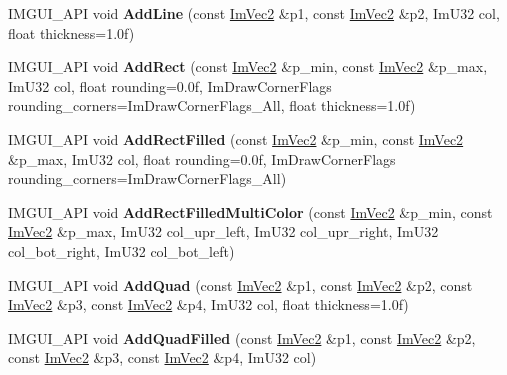 \begin{DoxyCompactItemize}
I\+M\+G\+U\+I\+\_\+\+A\+PI void {\bfseries Add\+Line} (const \hyperlink{structImVec2}{Im\+Vec2} \&p1, const \hyperlink{structImVec2}{Im\+Vec2} \&p2, Im\+U32 col, float thickness=1.\+0f)
\item 
\mbox{\label{structImDrawList_a766b752a701b00a7769b13c4c93cab06}} 
I\+M\+G\+U\+I\+\_\+\+A\+PI void {\bfseries Add\+Rect} (const \hyperlink{structImVec2}{Im\+Vec2} \&p\+\_\+min, const \hyperlink{structImVec2}{Im\+Vec2} \&p\+\_\+max, Im\+U32 col, float rounding=0.\+0f, Im\+Draw\+Corner\+Flags rounding\+\_\+corners=\+Im\+Draw\+Corner\+Flags\+\_\+\+All, float thickness=1.\+0f)
\item 
\mbox{\label{structImDrawList_af80a64eefee86b0f1b0876d3f753935d}} 
I\+M\+G\+U\+I\+\_\+\+A\+PI void {\bfseries Add\+Rect\+Filled} (const \hyperlink{structImVec2}{Im\+Vec2} \&p\+\_\+min, const \hyperlink{structImVec2}{Im\+Vec2} \&p\+\_\+max, Im\+U32 col, float rounding=0.\+0f, Im\+Draw\+Corner\+Flags rounding\+\_\+corners=\+Im\+Draw\+Corner\+Flags\+\_\+\+All)
\item 
\mbox{\label{structImDrawList_a6282e85ad78b01ebb74832336e9a2a55}} 
I\+M\+G\+U\+I\+\_\+\+A\+PI void {\bfseries Add\+Rect\+Filled\+Multi\+Color} (const \hyperlink{structImVec2}{Im\+Vec2} \&p\+\_\+min, const \hyperlink{structImVec2}{Im\+Vec2} \&p\+\_\+max, Im\+U32 col\+\_\+upr\+\_\+left, Im\+U32 col\+\_\+upr\+\_\+right, Im\+U32 col\+\_\+bot\+\_\+right, Im\+U32 col\+\_\+bot\+\_\+left)
\item 
\mbox{\label{structImDrawList_a57b014138de51397db0570d88c770d9f}} 
I\+M\+G\+U\+I\+\_\+\+A\+PI void {\bfseries Add\+Quad} (const \hyperlink{structImVec2}{Im\+Vec2} \&p1, const \hyperlink{structImVec2}{Im\+Vec2} \&p2, const \hyperlink{structImVec2}{Im\+Vec2} \&p3, const \hyperlink{structImVec2}{Im\+Vec2} \&p4, Im\+U32 col, float thickness=1.\+0f)
\item 
\mbox{\label{structImDrawList_a2b982fbad35f8736fdfc9d6e7db2ca94}} 
I\+M\+G\+U\+I\+\_\+\+A\+PI void {\bfseries Add\+Quad\+Filled} (const \hyperlink{structImVec2}{Im\+Vec2} \&p1, const \hyperlink{structImVec2}{Im\+Vec2} \&p2, const \hyperlink{structImVec2}{Im\+Vec2} \&p3, const \hyperlink{structImVec2}{Im\+Vec2} \&p4, Im\+U32 col)
\item 
\mbox{\label{structImDrawList_a04bde432891d0392e7d98d957c1fd9b3}} 

\end{DoxyCompactItemize}
